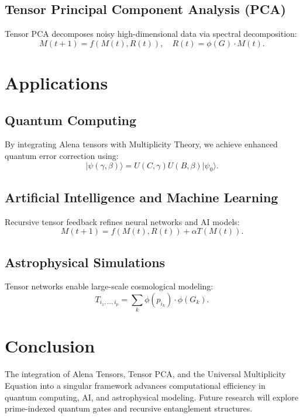 \documentclass{article}
\theoremstyle{plain}
\begin{document}
\subsection{Tensor Principal Component Analysis (PCA)}
Tensor PCA decomposes noisy high-dimensional data via spectral decomposition:
\begin{equation}
M (t+1) = f(M (t), R(t)), \quad R(t) = \phi(G) \cdot M (t).
\end{equation}

\section{Applications}
\subsection{Quantum Computing}
By integrating Alena tensors with Multiplicity Theory, we achieve enhanced quantum error correction using:
\begin{equation}
|\psi(\gamma, \beta)\rangle = U(C, \gamma)U(B, \beta)|\psi_0\rangle.
\end{equation}

\subsection{Artificial Intelligence and Machine Learning}
Recursive tensor feedback refines neural networks and AI models:
\begin{equation}
M(t+1) = f(M(t), R(t)) + \alpha T(M(t)).
\end{equation}

\subsection{Astrophysical Simulations}
Tensor networks enable large-scale cosmological modeling:
\begin{equation}
T_{i_1,\dots,i_p} = \sum_{k} \phi(p_{i_k}) \cdot \phi(G_k).
\end{equation}

\section{Conclusion}
The integration of Alena Tensors, Tensor PCA, and the Universal Multiplicity Equation into a singular framework advances computational efficiency in quantum computing, AI, and astrophysical modeling. Future research will explore prime-indexed quantum gates and recursive entanglement structures.



\end{document}
